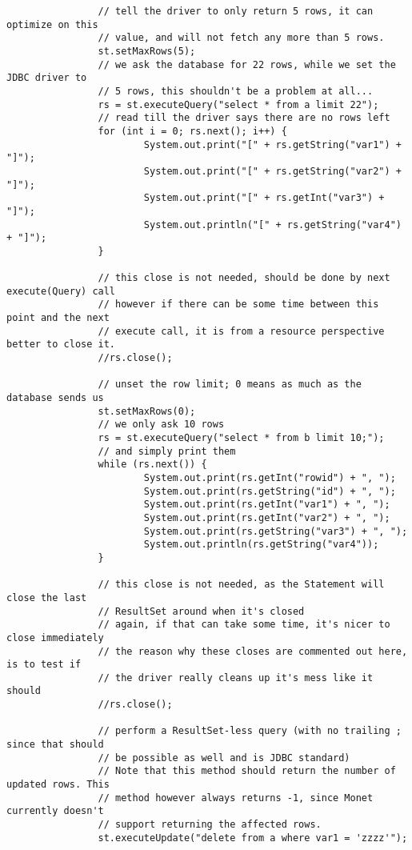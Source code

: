 \documentclass{article}
\begin{document}
\begin{verbatim}
                // tell the driver to only return 5 rows, it can optimize on this
                // value, and will not fetch any more than 5 rows.
                st.setMaxRows(5);
                // we ask the database for 22 rows, while we set the JDBC driver to
                // 5 rows, this shouldn't be a problem at all...
                rs = st.executeQuery("select * from a limit 22");
                // read till the driver says there are no rows left
                for (int i = 0; rs.next(); i++) {
                        System.out.print("[" + rs.getString("var1") + "]");
                        System.out.print("[" + rs.getString("var2") + "]");
                        System.out.print("[" + rs.getInt("var3") + "]");
                        System.out.println("[" + rs.getString("var4") + "]");
                }
                
                // this close is not needed, should be done by next execute(Query) call
                // however if there can be some time between this point and the next
                // execute call, it is from a resource perspective better to close it.
                //rs.close();
                
                // unset the row limit; 0 means as much as the database sends us
                st.setMaxRows(0);
                // we only ask 10 rows
                rs = st.executeQuery("select * from b limit 10;");
                // and simply print them
                while (rs.next()) {
                        System.out.print(rs.getInt("rowid") + ", ");
                        System.out.print(rs.getString("id") + ", ");
                        System.out.print(rs.getInt("var1") + ", ");
                        System.out.print(rs.getInt("var2") + ", ");
                        System.out.print(rs.getString("var3") + ", ");
                        System.out.println(rs.getString("var4"));
                }
                
                // this close is not needed, as the Statement will close the last
                // ResultSet around when it's closed
                // again, if that can take some time, it's nicer to close immediately
                // the reason why these closes are commented out here, is to test if
                // the driver really cleans up it's mess like it should
                //rs.close();

                // perform a ResultSet-less query (with no trailing ; since that should
                // be possible as well and is JDBC standard)
                // Note that this method should return the number of updated rows. This
                // method however always returns -1, since Monet currently doesn't
                // support returning the affected rows.
                st.executeUpdate("delete from a where var1 = 'zzzz'");


\end{verbatim}
\end{document}
